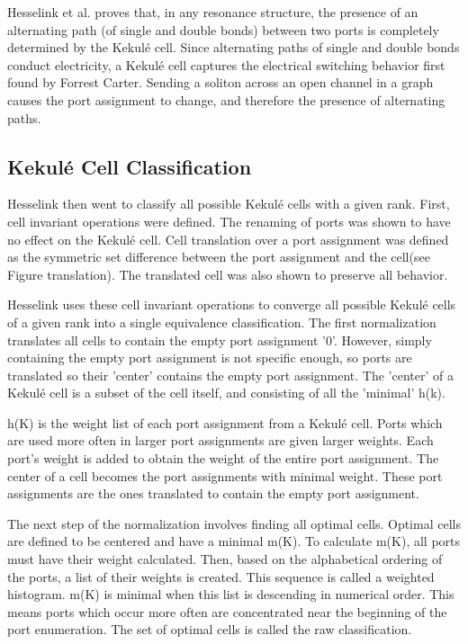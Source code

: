 \documentclass[12pt]{article}
\begin{document}
Hesselink et al.\cite{HH13} proves that, in any resonance structure, the presence of an alternating path (of single and double bonds) between two ports is completely determined by the Kekul\'e cell. Since alternating paths of single and double bonds conduct electricity, a Kekul\'e cell captures the electrical switching behavior first found by Forrest Carter. Sending a soliton across an open channel in a graph causes the port assignment to change, and therefore the presence of alternating paths.

\subsection{Kekul\'e Cell Classification}

Hesselink \cite{H13} then went to classify all possible Kekul\'e cells with a given rank. First, cell invariant operations were defined. The renaming of ports was shown to have no effect on the Kekul\'e cell. Cell translation over a port assignment was defined as the symmetric set difference between the port assignment and the cell(see Figure translation). The translated cell was also shown to preserve all behavior. 

Hesselink uses these cell invariant operations to converge all possible Kekul\'e cells of a given rank into a single equivalence classification. The first normalization translates all cells to contain the empty port assignment '0'. However, simply containing the empty port assignment is not specific enough, so ports are translated so their 'center' contains the empty port assignment. The 'center' of a Kekul\'e cell is a subset of the cell itself, and consisting of all the 'minimal' h(k).

h(K) is the weight list of each port assignment from a Kekul\'e cell. Ports which are used more often in larger port assignments are given larger weights. Each port's weight is added to obtain the weight of the entire port assignment. The center of a cell becomes the port assignments with minimal weight. 
These port assignments are the ones translated to contain the empty port assignment. 

The next step of the normalization involves finding all optimal cells. Optimal cells are defined to be centered and have a minimal m(K). To calculate m(K), all ports must have their weight calculated. Then, based on the alphabetical ordering of the ports, a list of their weights is created. This sequence is called a weighted histogram. m(K) is minimal when this list is descending in numerical order. %
This means ports which occur more often are concentrated near the beginning of the port enumeration. The set of optimal cells is called the raw classification. 
\end{document}
